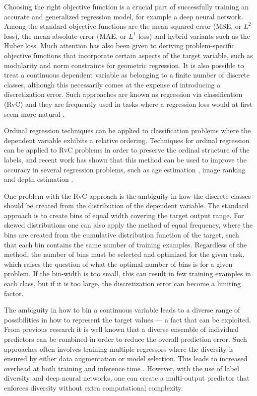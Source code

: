 \documentclass[10pt, conference, a4paper]{IEEEtran}
\begin{document}
Choosing the right objective function is a crucial part of successfully training an accurate and generalized regression model, for example a deep neural network. Among the standard objective functions are the mean squared error (MSE, or $L^2$ loss), the mean absolute error (MAE, or $L^1$-loss) and hybrid variants such as the Huber loss. Much attention has also been given to deriving problem-specific objective functions that incorporate certain aspects of the target variable, such as modularity and norm constraints for geometric regression. It is also possible to treat a continuous dependent variable as belonging to a finite number of discrete classes, although this necessarily comes at the expense of introducing a discretization error. Such approaches are known as regression via classification (RvC) and they are frequently used in tasks where a regression loss would at first seem more natural \cite{workman2016horizon, wang2015designing, zeisl2014discriminatively, tulsiani2015viewpoints, abbas2019geometric, rothe2015dex}. 

Ordinal regression techniques can be applied to classification problems where the dependent variable exhibits a relative ordering. Techniques for ordinal regression can be applied to RvC problems in order to preserve the ordinal structure of the labels, and recent work has shown that this method can be used to improve the accuracy in several regression problems, such as age estimation \cite{niu2016ordinal} \cite{beckham2017unimodal}, image ranking and depth estimation \cite{diaz2019soft}.

One problem with the RvC approach is the ambiguity in how the discrete classes should be created from the distribution of the dependent variable. The standard approach is to create bins of equal width covering the target output range. For skewed distributions one can also apply the method of equal frequency, where the bins are created from the cumulative distribution function of the target, such that each bin contains the same number of training examples. Regardless of the method, the number of bins must be selected and optimized for the given task, which raises the question of what the optimal number of bins is for a given problem. If the bin-width is too small, this can result in few training examples in each class, but if it is too large, the discretization error can become a limiting factor.

The ambiguity in how to bin a continuous variable leads to a diverse range of possibilities in how to represent the target values --- a fact that can be exploited. From previous research it is well known that a diverse ensemble of individual predictors can be combined in order to reduce the overall prediction error. Such approaches often involves training multiple regressors where the diversity is ensured by either data augmentation or model selection. This leads to increased overhead at both training and inference time \cite{ren2016ensemble}. However, with the use of label diversity and deep neural networks, one can create a multi-output predictor that enforces diversity without extra computational complexity.
\end{document}
